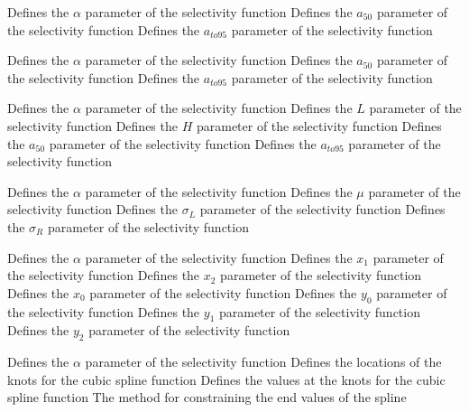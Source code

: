 \par\textbf{}\par
{} {Defines the $\alpha$ parameter of the selectivity function}
 {Defines the $a_{50}$ parameter of the selectivity function}
 {Defines the $a_{to95}$ parameter of the selectivity function}
\par\textbf{}\par
{} {Defines the $\alpha$ parameter of the selectivity function}
 {Defines the $a_{50}$ parameter of the selectivity function}
 {Defines the $a_{to95}$ parameter of the selectivity function}
\par\textbf{}\par
{} {Defines the $\alpha$ parameter of the selectivity function}
 {Defines the $L$ parameter of the selectivity function}
 {Defines the $H$ parameter of the selectivity function}
 {Defines the $a_{50}$ parameter of the selectivity function}
 {Defines the $a_{to95}$ parameter of the selectivity function}
\par\textbf{}\par
{} {Defines the $\alpha$ parameter of the selectivity function}
 {Defines the $\mu$ parameter of the selectivity function}
 {Defines the $\sigma_L$ parameter of the selectivity function}
 {Defines the $\sigma_R$ parameter of the selectivity function}
\par\textbf{}\par
{} {Defines the $\alpha$ parameter of the selectivity function}
 {Defines the $x_1$ parameter of the selectivity function}
 {Defines the $x_2$ parameter of the selectivity function}
 {Defines the $x_0$ parameter of the selectivity function}
 {Defines the $y_0$ parameter of the selectivity function}
 {Defines the $y_1$ parameter of the selectivity function}
 {Defines the $y_2$ parameter of the selectivity function}
\par\textbf{}\par
{} {Defines the $\alpha$ parameter of the selectivity function}
 {Defines the locations of the knots for the cubic spline function}
 {Defines the values at the knots for the cubic spline function}
 {The method for constraining the end values of the spline}
